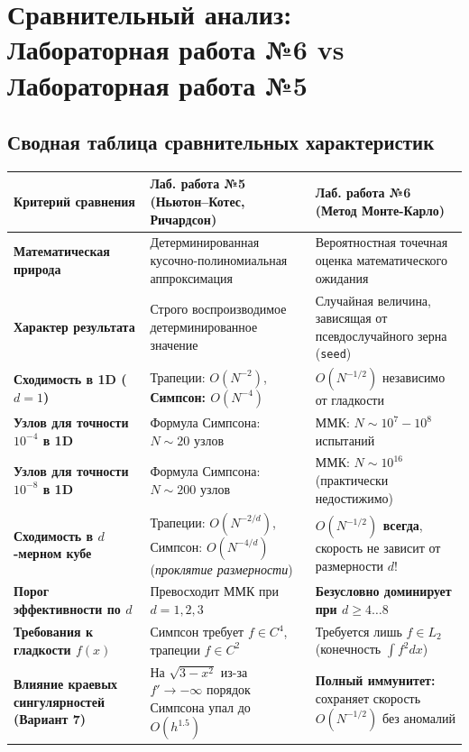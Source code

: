 \documentclass[11pt,a4paper]{article}
\begin{document}
\newpage

\section{Сравнительный анализ: Лабораторная работа №6 vs Лабораторная работа №5}

\subsection{Сводная таблица сравнительных характеристик}

\begin{table}[h!]
\centering
\small
\begin{tabularx}{\textwidth}{p{3.8cm} X X}
\toprule
\textbf{Критерий сравнения} & \textbf{Лаб. работа №5 (Ньютон--Котес, Ричардсон)} & \textbf{Лаб. работа №6 (Метод Монте-Карло)} \\
\midrule
\textbf{Математическая природа} & Детерминированная кусочно-полиномиальная аппроксимация & Вероятностная точечная оценка математического ожидания \\
\addlinespace
\textbf{Характер результата} & Строго воспроизводимое детерминированное значение & Случайная величина, зависящая от псевдослучайного зерна (\texttt{seed}) \\
\addlinespace
\textbf{Сходимость в 1D ($d=1$)} & Трапеции: $O(N^{-2})$, \textbf{Симпсон: $O(N^{-4})$} & \textbf{$O(N^{-1/2})$} независимо от гладкости \\
\addlinespace
\textbf{Узлов для точности $10^{-4}$ в 1D} & Формула Симпсона: $N \sim 20$ узлов & ММК: $N \sim 10^7 - 10^8$ испытаний \\
\addlinespace
\textbf{Узлов для точности $10^{-8}$ в 1D} & Формула Симпсона: $N \sim 200$ узлов & ММК: $N \sim 10^{16}$ (практически недостижимо) \\
\addlinespace
\textbf{Сходимость в $d$-мерном кубе} & Трапеции: $O(N^{-2/d})$, Симпсон: $O(N^{-4/d})$ (\textit{проклятие размерности}) & \textbf{$O(N^{-1/2})$ всегда}, скорость не зависит от размерности $d$! \\
\addlinespace
\textbf{Порог эффективности по $d$} & Превосходит ММК при $d = 1, 2, 3$ & \textbf{Безусловно доминирует при $d \ge 4 \dots 8$} \\
\addlinespace
\textbf{Требования к гладкости $f(x)$} & Симпсон требует $f \in C^4$, трапеции $f \in C^2$ & Требуется лишь $f \in L_2$ (конечность $\int f^2 dx$) \\
\addlinespace
\textbf{Влияние краевых сингулярностей (Вариант 7)} & На $\sqrt{3-x^2}$ из-за $f' \to -\infty$ порядок Симпсона упал до $O(h^{1.5})$ & \textbf{Полный иммунитет:} сохраняет скорость $O(N^{-1/2})$ без аномалий \\

\end{tabularx}
\end{table}
\end{document}
